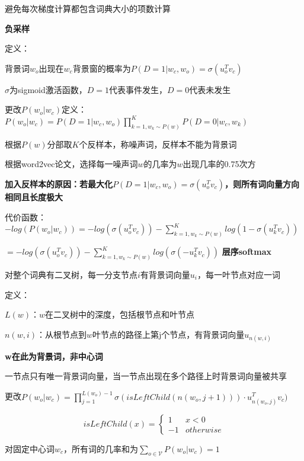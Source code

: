 \documentclass[UTF8]{ctexart}
\begin{document}
  避免每次梯度计算都包含词典大小的项数计算

  \textbf{负采样}

  \quad 定义：

  \quad \quad 背景词$w_o$出现在$w_c$背景窗的概率为$P(D = 1|w_c, w_o) = \sigma(u_o^Tv_c)$

  \quad \quad \quad $\sigma$为sigmoid激活函数，$D = 1$代表事件发生，$D = 0$代表未发生

  \quad 更改$P(w_o | w_c)$定义：$P(w_o | w_c) = P(D = 1| w_c, w_o)\prod_{k=1, w_k \sim P(w)}^{K}P(D = 0 | w_c, w_k)$

  \quad \quad 根据$P(w)$分部取$K$个反样本，称噪声词，反样本不能为背景词

  \quad \quad \quad 根据word2vec论文，选择每一噪声词$w$的几率为$w$出现几率的0.75次方

  \quad \quad \textbf{加入反样本的原因：若最大化$P(D = 1|w_c, w_o) = \sigma(u_o^Tv_c)$，则所有词向量方向相同且长度极大}

  \quad 代价函数：$-log(P(w_o | w_c)) = -log(\sigma(u_o^Tv_c)) - \sum_{k=1, w_k \sim P(w)}^{K}log(1-\sigma(u_k^Tv_c))$

  \quad \quad $ = -log(\sigma(u_o^Tv_c)) - \sum_{k=1, w_k \sim P(w)}^{K}log(\sigma(-u_k^Tv_c))$
  \textbf{层序softmax}
  
  \quad 对整个词典有二叉树，每一分支节点$i$有背景词向量$u_i$，每一叶节点对应一词

  \quad 定义：

  \quad \quad $L(w)$：$w$在二叉树中的深度，包括根节点和叶节点

  \quad \quad $n(w, i)$：从根节点到$w$叶节点的路径上第j个节点，有背景词向量$u_{n(w, i)}$

  \quad \quad \quad \textbf{w在此为背景词，非中心词}

  \quad \quad \quad 一节点只有唯一背景词向量，当一节点出现在多个路径上时背景词向量被共享

  \quad 更改$P(w_o | w_c) = \prod_{j=1}^{L(w_o) - 1} \sigma(isLeftChild(n(w_o, j+1))) \cdot u_{n(w_o, j)}^Tv_c)$

  \quad \quad \begin{equation*}
    isLeftChild(x) = \begin{cases}
    1 &x < 0\\
    -1 & otherwise
    \end{cases}
  \end{equation*}

  \quad \quad 对固定中心词$w_c$，所有词的几率和为$\sum_{o \in \mathcal{V}} P(w_o | w_c) = 1$
\end{document}
